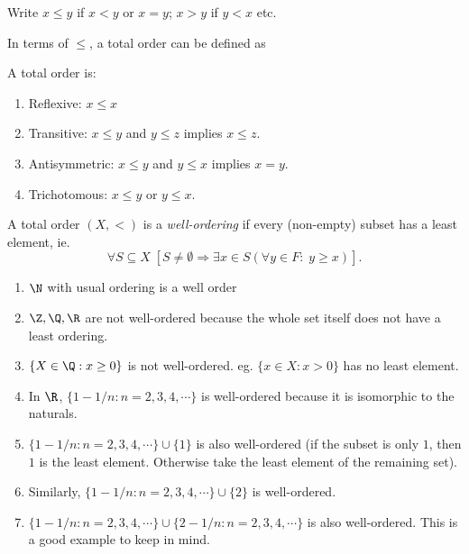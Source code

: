 \documentclass[a4paper]{article}
\begin{document}
\begin{notation}
  Write $x \leq y$ if $x < y$ or $x = y$; $x > y$ if $y < x$ etc.
\end{notation}

In terms of $\leq$, a total order can be defined as
\begin{defi}
  A total order is:
  \begin{enumerate}
    \item Reflexive: $x \leq x$
    \item Transitive: $x\leq y$ and $y \leq z$ implies $x\leq z$.
    \item Antisymmetric: $x\leq y$ and $y\leq x$ implies $x = y$.
    \item Trichotomous: $x\leq y$ or $y\leq x$.
  \end{enumerate}
\end{defi}

\begin{defi}
  A total order $(X, <)$ is a \emph{well-ordering} if every (non-empty) subset has a least element, ie.
  \[
    \forall S\subseteq X\; [S\not= \emptyset \Rightarrow  \exists x\in S (\forall y\in F:\; y \geq x)].
  \]
\end{defi}

\begin{eg}\leavevmode
  \begin{enumerate}
    \item $\N$ with usual ordering is a well order
    \item $\Z, \Q, \R$ are not well-ordered because the whole set itself does not have a least ordering.
    \item $\{X\in \Q: x\geq 0\}$ is not well-ordered. eg. $\{x\in X: x> 0\}$ has no least element.
    \item In $\R$, $\{1 - 1/n: n = 2, 3, 4, \cdots\}$ is well-ordered because it is isomorphic to the naturals.
    \item $\{1- 1/n: n = 2, 3, 4, \cdots\} \cup \{1\}$ is also well-ordered (if the subset is only $1$, then $1$ is the least element. Otherwise take the least element of the remaining set).
    \item Similarly, $\{1 - 1/n: n = 2, 3, 4, \cdots\}\cup \{2\}$ is well-ordered.
    \item $\{1 - 1/n: n = 2, 3, 4, \cdots\} \cup \{2 - 1/n: n = 2, 3, 4, \cdots\}$ is also well-ordered. This is a good example to keep in mind.
  \end{enumerate}
\end{eg}
\end{document}
